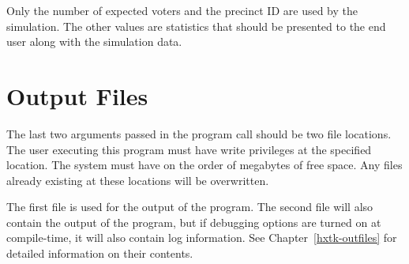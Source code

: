 Only the number of expected voters and the precinct ID are used by the simulation. The other values are statistics that should be presented to the end user along with the simulation data.

\section{Output Files}

The last two arguments passed in the program call should be two file locations. The user executing this program must have write privileges at the specified location. The system must have on the order of megabytes of free space. Any files already existing at these locations will be overwritten.

The first file is used for the output of the program. The second file will also contain the output of the program, but if debugging options are turned on at compile-time, it will also contain log information. See Chapter~\ref{hxtk-outfiles} for detailed information on their contents.